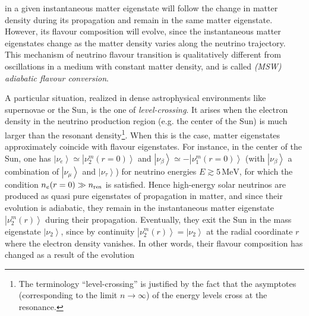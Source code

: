 in a given instantaneous matter eigenstate will follow the change in matter density during its
propagation and remain in the same matter eigenstate. However,
its flavour composition will evolve, since the instantaneous matter eigenstates change
as the matter density varies along the neutrino trajectory. This mechanism of neutrino flavour
transition is qualitatively different from oscillations in a medium with constant matter density,
and is called {\it (MSW) adiabatic flavour conversion}.

A particular situation, realized in dense astrophysical environments like supernovae or the Sun,
is the one of {\it level-crossing}. It arises when the electron density in the neutrino production
region (e.g. the center of the Sun) is much larger than the resonant density\footnote{The
terminology ``level-crossing'' is justified by the fact that the asymptotes (corresponding to
the limit $n \to \infty$) of the energy levels cross at the resonance.}. When this
is the case, matter eigenstates approximately coincide with flavour eigenstates.
For instance, in the center of the Sun, one has $\left|\nu_e\right> \simeq \left|\nu^m_2 (r=0) \right>$
and $\left|\nu_\beta\right> \simeq - \left|\nu^m_1 (r=0) \right>$ (with $\left| \nu_\beta \right>$
a combination of $\left| \nu_\mu \right>$ and $\left| \nu_\tau \right>$) for neutrino energies
$E \gtrsim 5\, \mbox{MeV}$, for which the condition $n_e(r=0) \gg n_{\rm res}$ is satisfied.
Hence high-energy solar neutrinos are produced as quasi pure eigenstates of propagation in matter,
and since their evolution is adiabatic, they remain in the instantaneous matter eigenstate
$\left|\nu^m_2 (r) \right>$ during their propagation. Eventually, they exit the Sun in the mass
eigenstate $\left|\nu_2 \right>$, since by continuity $\left|\nu^m_2 (r) \right> = \left|\nu_2 \right>$
at the radial coordinate $r$ where the electron density vanishes.
%
In other words, their flavour composition has changed as a result of the evolution
